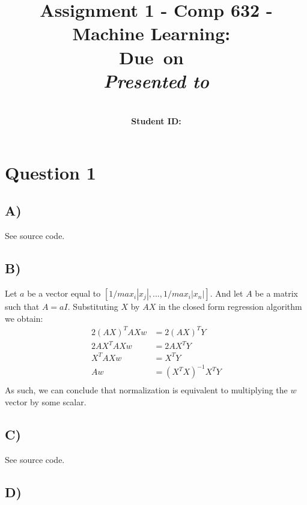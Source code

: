 \documentclass{report}
\title{Assignment 1 - Comp 632 - Machine Learning}
\title{\vspace{2in}\textmd{\textbf{\hmwkClass:\ \hmwkTitle}}\\
\normalsize\vspace{0.1in}\small{Due\ on\ \hmwkDueDate}\\
\vspace{0.1in}\large{\textit{Presented to \hmwkClassInstructor}}\vspace{3in}}
\date{}
\author{\textbf{\hmwkAuthorName}\\
    \textbf{Student ID: \hmwkAuthorNumber}}
\begin{document}
\maketitle
\section*{Question 1}
\subsection*{A)}
See source code.
\subsection*{B)}
Let $a$ be a vector equal to $[1/max_i |x_j|, ..., 1/max_i |x_n|]$. And let $A$
be a matrix such that $A=aI$. Substituting $X$ by $AX$ in the closed form regression
algorithm we obtain:
\begin{equation}
  \begin{aligned}
  2(AX)^TAXw &= 2(AX)^TY \\
  2AX^TAXw &= 2AX^TY \\
  X^TAXw &= X^TY \\
  Aw &= (X^TX)^{-1}X^TY \\
  \end{aligned}
\end{equation}
As such, we can conclude that normalization is equivalent to multiplying the $w$
vector by some scalar.
\subsection*{C)}
See source code.
\subsection*{D)}
\end{document}
